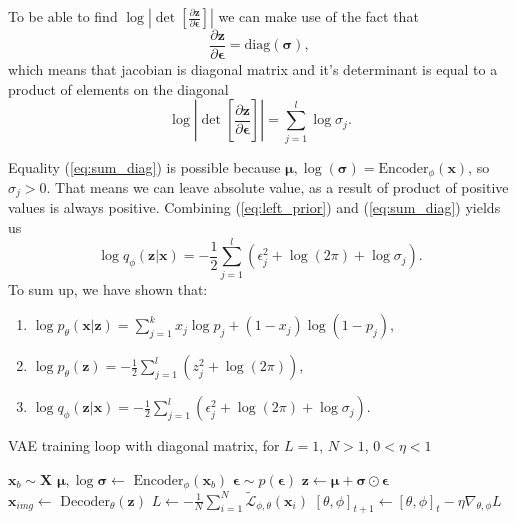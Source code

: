 \documentclass[10pt]{article}
\begin{document}
To be able to find $\log | \det \left[\frac{\partial \textbf{z} }{\partial \bm{\epsilon}} \right] |$ we can make use of the fact that  
\begin{equation}
    \frac{\partial \textbf{z} }{\partial \bm{\epsilon}} = \text{diag}(\bm{\sigma}),
\end{equation}
which means that jacobian is diagonal matrix and it's determinant is equal to a product of elements on the diagonal
\begin{equation} \label{eq:sum_diag}
    \log \left| \det \left[\frac{\partial \textbf{z} }{\partial \bm{\epsilon}} \right] \right| 
    =  \sum_{j=1}^{l} \log \sigma_j.
\end{equation}

Equality (\ref{eq:sum_diag}) is possible  because $\bm{\mu}, \log(\bm{\sigma}) = \text{Encoder}_{\phi}(\textbf{x})$, so  $ \sigma_j > 0$. That means we can leave absolute value, as a result of product of positive values is always positive. Combining (\ref{eq:left_prior}) and (\ref{eq:sum_diag}) yields us
\begin{equation}
    \log q_{\phi }(\textbf{z}|\textbf{x}) = -\frac{1}{2}\sum_{j=1}^{l}( \epsilon_j^{2} + \log(2\pi) + \log \sigma_j ).
\end{equation}
To sum up, we have shown that:
\begin{enumerate}
    \item $\log p_{\theta }(\textbf{x}|\textbf{z}) = \sum_{j=1}^{k} x_j \log p_j + (1-x_j)\log(1 - p_j)$,
    \item $  \log p_{\theta }(\textbf{z}) = -\frac{1}{2}\sum_{j=1}^{l}( z_j^{2} + \log(2\pi) )$,
    \item $\log q_{\phi }(\textbf{z}|\textbf{x}) = 
    -\frac{1}{2}\sum_{j=1}^{l}( \epsilon_j^{2} + \log(2\pi) + \log \sigma_j )$.
\end{enumerate}

\begin{algorithm} [H]
\caption{VAE training loop with diagonal matrix, for $L=1$, $N > 1$, 
$ 0 < \eta < 1$}\label{alg:cap}
\begin{algorithmic}
\State $\textbf{x}_{b} \sim \textbf{X}$
\State $\bm{\mu}, \log \bm{\sigma} \gets \text{ Encoder}_{\phi}(\textbf{x}_{b}) $
\State $\bm{\epsilon} \sim p(\bm{\epsilon})$
\State $\textbf{z} \gets \bm{\mu} + \bm{\sigma} \odot  \bm{\epsilon}$
\State $\textbf{x}_{img} \gets \text{ Decoder}_{\theta}(\textbf{z}) $
\State $  L
    \gets  -\frac{1}{N}\sum_{i=1}^{N} \tilde{ \mathcal{L}}_{\phi, \theta}(\textbf{x}_{i})  $
\State $ [\theta, \phi]_{t+1} \gets [\theta, \phi]_{t} - \eta \nabla_{\theta, \phi} L$
\EndWhile
\end{algorithmic}
\end{algorithm}
\end{document}
